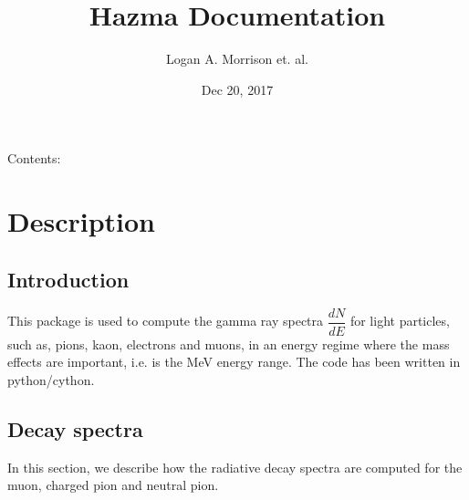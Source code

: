\documentclass[letterpaper,10pt,english]{sphinxmanual}
\title{Hazma Documentation}
\date{Dec 20, 2017}
\author{Logan A. Morrison et. al.}
\let\sphinxpxdimen\pdfpxdimen\else\newdimen\sphinxpxdimen
\begin{document}
\maketitle
\sphinxtableofcontents
{}\label{\detokenize{index::doc}}


Contents:


\chapter{Description}
\label{\detokenize{description::doc}}\label{\detokenize{description:description}}\label{\detokenize{description:welcome-to-hazma-s-documentation}}
\noindent{\hspace*{\fill}\sphinxincludegraphics[width=200\sphinxpxdimen,height=200\sphinxpxdimen]{{Hazma}.png}\hspace*{\fill}}


\section{Introduction}
\label{\detokenize{description:introduction}}
This package is used to compute the gamma ray spectra \(\dfrac{dN}{dE}\) for light particles, such as, pions, kaon, electrons and muons, in an energy regime where the mass effects are important, i.e. is the MeV energy range. The code has been written in python/cython.


\section{Decay spectra}
\label{\detokenize{description:decay-spectra}}
In this section, we describe how the radiative decay spectra are computed for the muon, charged pion and neutral pion.
\end{document}
